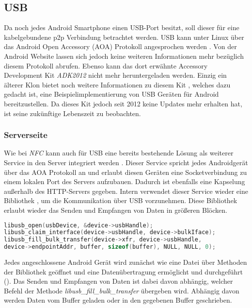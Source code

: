     \subsection{USB}
        Da noch jedes Android Smartphone einen USB-Port besitzt, soll dieser für eine kabelgebundene p2p Verbindung betrachtet werden. USB kann unter Linux über das Android Open Accessory (AOA) Protokoll angesprochen werden \cite{aoa}. Von der Android Website lassen sich jedoch keine weiteren Informationen mehr bezüglich diesem Protokoll abrufen. Ebenso kann das dort erwähnte Accessory Development Kit {\it ADK2012} nicht mehr heruntergeladen werden. Einzig ein älterer Klon bietet noch weitere Informationen zu diesem Kit \cite{mitADK}, welches dazu gedacht ist, eine Beispielimplementierung von USB Geräten für Android bereitzustellen. Da dieses Kit jedoch seit 2012 keine Updates mehr erhalten hat, ist seine zukünftige Lebenszeit zu beobachten.
    \subsubsection{Serverseite}
        Wie bei {\it NFC} kann auch für USB eine bereits bestehende Lösung als weiterer Service in den Server integriert werden \cite{aoaProxyAccessory}. Dieser Service spricht jedes Androidgerät über das AOA Protokoll an und erlaubt diesen Geräten eine Socketverbindung zu einem lokalen Port des Servers aufzubauen. Dadurch ist ebenfalls eine Kapselung außerhalb des HTTP-Servers gegeben. Intern verwendet dieser Service wieder eine Bibliothek \cite{libusb}, um die Kommunikation über USB vorzunehmen. Diese Bibliothek erlaubt wieder das Senden und Empfangen von Daten in größeren Blöcken.  
        \begin{lstlisting}[frame=bt, label={lst:usb:server}, language=C, caption=Verbindungsaufbau über USB (Servercode in C) \cite{aoaProxyAccessory}]
libusb_open(usbDevice, &device->usbHandle);
libusb_claim_interface(device->usbHandle, device->bulkIface);
libusb_fill_bulk_transfer(device->xfr, device->usbHandle,
device->endpointAddr, buffer, sizeof(buffer), NULL, NULL, 0);
        \end{lstlisting}
        Jedes angeschlossene Android Gerät wird zunächst wie eine Datei über Methoden der Bibliothek geöffnet und eine Datenübertragung ermöglicht und durchgeführt (). Das Senden und Empfangen von Daten ist dabei davon abhängig, welcher Befehl der Methode {\it libusb\_fill\_bulk\_transfer} übergeben wird. Abhängig davon werden Daten vom Buffer geladen oder in den gegebenen Buffer geschrieben.
